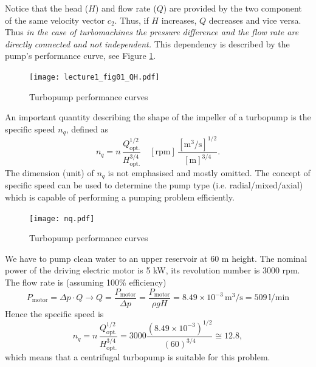 Notice that the head ($H$) and flow rate ($Q$) are provided by the two component of the same velocity vector $c_2$. Thus, if $H$ increases, $Q$ decreases and vice versa. Thus \emph{in the case of turbomachines the pressure difference and the flow rate are directly connected and not independent.} This dependency is described by the pump's performance curve, see Figure \ref{fig:turbopump_perf_curve}.

\begin{figure}[th]
\begin{center}
\texttt{[image: lecture1\_fig01\_QH.pdf]}
\caption{\label{fig:turbopump_perf_curve}Turbopump performance curves}
\end{center}
\end{figure}

An important quantity describing the shape of the impeller of a turbopump is the specific speed $n_q$, defined as
%
\begin{equation}
n_q=n\,\frac{Q^{1/2}_{\mathrm{opt.}}}{H^{3/4}_{\mathrm{opt.}}}\quad \mathrm{[rpm]}\,\frac{\mathrm{[m^3/s]^{1/2}}}{\mathrm{[m]^{3/4}}}.
\end{equation}
%
The dimension (unit) of $n_q$ is not emphasised and mostly omitted. The concept of specific speed can be used to determine the pump type (i.e. radial/mixed/axial) which is capable of performing a pumping problem efficiently.

\begin{figure}[h!]
\begin{center}
\texttt{[image: nq.pdf]}
\caption{\label{fig:nq}Turbopump performance curves}
\end{center}
\end{figure}


\vspace{0.5cm}

 We have to pump clean water to an upper reservoir at 60 m height. The nominal power of the driving electric motor is 5 kW, its revolution number is 3000 rpm. The flow rate is (assuming 100\% efficiency)
%
\begin{equation}
P_{\mathrm{motor}}=\Delta p\cdot Q\rightarrow Q=\frac{P_{\mathrm{motor}}}{\Delta p}=\frac{P_{\mathrm{motor}}}{\rho gH}=8.49\times 10^{-3}\,\mathrm{m^3/s}=509\,\mathrm{l/min}
\end{equation}
%
\noindent Hence the specific speed is
%
\begin{equation}
n_q=n\,\frac{Q^{1/2}_{\mathrm{opt.}}}{H^{3/4}_{\mathrm{opt.}}}=3000\frac{\left(8.49\times 10^{-3}\right)^{1/2}}{\left(60\right)^{3/4}}\cong 12.8,
\end{equation}
%
\noindent which means that a centrifugal turbopump is suitable for this problem.

